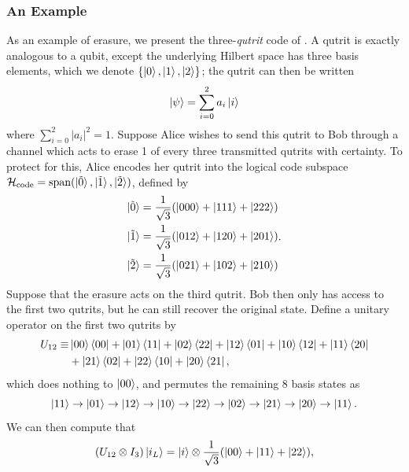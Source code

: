 \documentclass[12pt,a4paper]{report}
\numberwithin{equation}{section}
\newcommand{\ketbra}[2]{\ket{#1}\bra{#2}}
\newcommand{\ketbras}[1]{\ketbra{#1}{#1}}
\newcommand{\Hcode}{\mathcal{H}_{\text{code}}}
\theoremstyle{definition}
\theoremstyle{theorem}
\theoremstyle{theorem}
\theoremstyle{example}
\theoremstyle{definition}
\begin{document}
\subsubsection{An Example}
As an example of erasure, we present the three-\textit{qutrit} code of \cite{Harlow}. A qutrit is exactly analogous to a qubit, except the underlying Hilbert space has three basis elements, which we denote $\{\ket{0},\ket{1},\ket{2}\}$; the qutrit can then be written
\begin{equation}
	\ket{\psi}=\sum_{i=0}^{2}a_{i}\ket{i}
\end{equation}
where $\sum_{i=0}^{2}|a_{i}|^{2}=1$. Suppose Alice wishes to send this qutrit to Bob through a channel which acts to erase 1 of every three transmitted qutrits with certainty. To protect for this, Alice encodes her qutrit into the logical code subspace $\Hcode=\text{span}(\ket{\tilde{0}},\ket{\tilde{1}},\ket{\tilde{2}})$, defined by
\begin{equation}
	\begin{aligned}
		\ket{\tilde{0}}&=\frac{1}{\sqrt{3}}(\ket{000}+\ket{111}+\ket{222})\\
		\ket{\tilde{1}}&=\frac{1}{\sqrt{3}}(\ket{012}+\ket{120}+\ket{201})\\
		\ket{\tilde{2}}&=\frac{1}{\sqrt{3}}(\ket{021}+\ket{102}+\ket{210})
	\end{aligned}.
\end{equation}
Suppose that the erasure acts on the third qutrit. Bob then only has access to the first two qutrits, but he can still recover the original state. Define a unitary operator on the first two qutrits by
\begin{equation}
	\begin{aligned}
		U_{12}\equiv&\ketbras{00}+\ketbra{01}{11}+\ketbra{02}{22}+\ketbra{12}{01}+\ketbra{10}{12}+\ketbra{11}{20}\\&+\ketbra{21}{02}+\ketbra{22}{10}+\ketbra{20}{21},
	\end{aligned}
\end{equation}
which does nothing to $\ket{00}$, and permutes the remaining 8 basis states as
\begin{equation}
	\ket{11}\to\ket{01}\to\ket{12}\to\ket{10}\to\ket{22}\to\ket{02}\to\ket{21}\to\ket{20}\to\ket{11}.
\end{equation}
We can then compute that
\begin{equation}
	(U_{12}\otimes I_{3})\ket{i_{L}}=\ket{i}\otimes\frac{1}{\sqrt{3}}(\ket{00}+\ket{11}+\ket{22}),
\end{equation}
\end{document}
